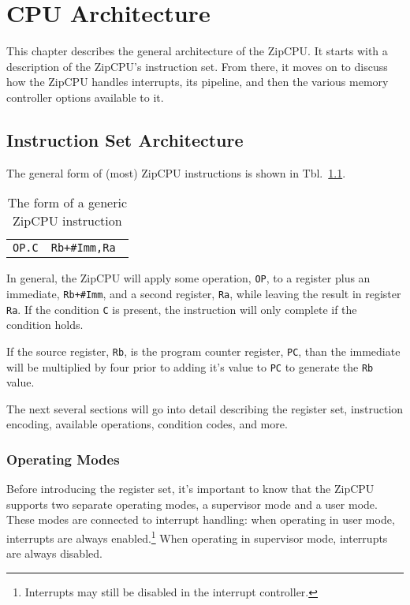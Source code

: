 \documentclass{gqtekspec}
\begin{document}
\chapter{CPU Architecture}\label{chap:arch}
This chapter describes the general architecture of the ZipCPU.  It starts
with a description of the ZipCPU's instruction set.  From there, it moves
on to discuss how the ZipCPU handles interrupts, its pipeline, and then
the various memory controller options available to it.

\section{Instruction Set Architecture}\label{sec:isa}
The general form of (most) ZipCPU instructions is shown in
Tbl.~\ref{tbl:gen-insn}.
\begin{table}\begin{center}
\begin{tabular}{ll}
	{\tt OP.C}&{\tt Rb+\#Imm,Ra } \\
\end{tabular}%
\caption{The form of a generic ZipCPU instruction}\label{tbl:gen-insn}%
\end{center}\end{table}
In general, the ZipCPU will apply some operation, {\tt OP}, to a register
plus an immediate, {\tt Rb+\#Imm}, and a second register, {\tt Ra},
while leaving the result in register {\tt Ra}.  If the condition {\tt C}
is present, the instruction will only complete if the condition holds.

If the source register, {\tt Rb}, is the program counter register, {\tt PC},
than the immediate will be multiplied by four prior to adding it's value to
{\tt PC} to generate the {\tt Rb} value.

The next several sections will go into detail describing the register
set, instruction encoding, available operations, condition codes, and more.

\subsection{Operating Modes}
Before introducing the register set, it's important to know that
the ZipCPU supports two separate operating modes, a supervisor mode and a user
mode.  These modes are connected to interrupt handling: when operating in user
mode, interrupts are always enabled.\footnote{Interrupts may still be disabled
in the interrupt controller.}  When operating in supervisor mode,
interrupts are always disabled.
\end{document}
